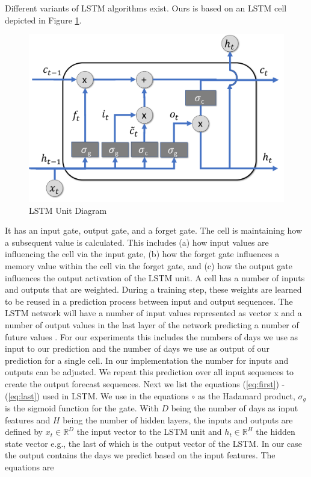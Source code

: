 \documentclass[a4paper, inpress]{jds} %
\renewcommand{\_}{%
    \textunderscore\hspace{0pt}%
}
\begin{document}
Different variants of LSTM algorithms exist. Ours is based on an LSTM
cell depicted in Figure \ref{fig:lstm}.  

\begin{figure}[!htb]
    \centering
    \includegraphics[width=0.6\columnwidth]{images/lstm.pdf}
    \caption{LSTM Unit Diagram}
    \label{fig:lstm}
\end{figure}


\newcommand{\RH}{\mathbb{R}^{H}}
\newcommand{\RD}{\mathbb{R}^{D}}

It has an input gate, output
gate, and a forget gate. The cell is maintaining how a subsequent
value is calculated. This includes (a) how input values are
influencing the cell via the input gate, (b) how the forget gate
influences a memory value within the cell via the forget gate, and (c)
how the output gate influences the output activation of the LSTM
unit. A cell has a number of inputs and outputs that are
weighted. During a training step, these weights are learned to be
reused in a prediction process between input and output sequences.
The LSTM network will have a number of input values represented as
vector x and a number of output values in the last layer of the
network predicting a number of future values
\citep{lstm-explained}. For our experiments this includes the numbers
of days we use as input to our prediction and the number of days we
use as output of our prediction for a single cell. In our
implementation the number for inputs and outputs can be adjusted. We
repeat this prediction over all input sequences to create the output
forecast sequences. Next we list the equations (\ref{eq:first}) -
(\ref{eq:last}) used in LSTM.  We use in the equations $\circ$ as the
Hadamard product,
$\sigma_g$ is the sigmoid function for the gate.
With 
$D$ being the number of days as input features and
$H$ being the number of hidden layers, the 
inputs and outputs are defined by  
$x_{t} \in \RD$ the input vector to the LSTM unit and
$h_{t} \in \RH$ the hidden state vector e.g., the last of which is the
output vector of the LSTM. In our case the output contains the days we
predict based on the input features. The equations are
\end{document}
